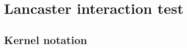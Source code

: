 \documentclass[]{article}
\begin{document}
%
%
%

\section{Lancaster interaction test}\label{section:main}

\subsection{Kernel notation}
\end{document}
